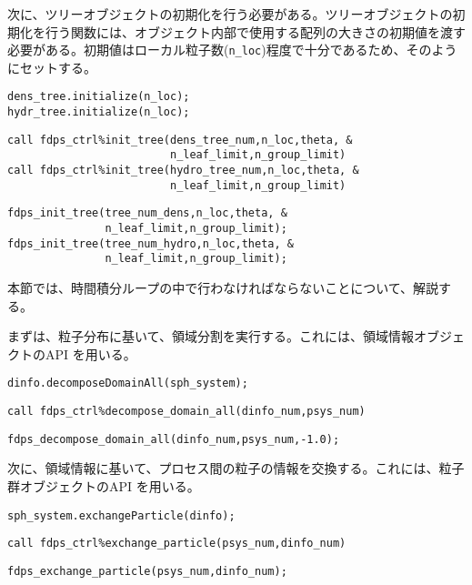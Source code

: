 次に、ツリーオブジェクトの初期化を行う必要がある。ツリーオブジェクトの初期化を行う関数には、オブジェクト内部で使用する配列の大きさの初期値を渡す必要がある。初期値はローカル粒子数(\texttt{n\_loc})程度で十分であるため、そのようにセットする。
\ifCpp %
\begin{lstlisting}[caption=相互作用ツリークラスの初期化]
dens_tree.initialize(n_loc);
hydr_tree.initialize(n_loc);
\end{lstlisting}
\endifCpp
\ifFtn %
\begin{lstlisting}[caption=相互作用ツリークラスの初期化]
call fdps_ctrl%init_tree(dens_tree_num,n_loc,theta, &
                         n_leaf_limit,n_group_limit)
call fdps_ctrl%init_tree(hydro_tree_num,n_loc,theta, &
                         n_leaf_limit,n_group_limit)
\end{lstlisting}
\endifFtn
\ifC %
\begin{lstlisting}[caption=相互作用ツリークラスの初期化]
fdps_init_tree(tree_num_dens,n_loc,theta, &
               n_leaf_limit,n_group_limit);
fdps_init_tree(tree_num_hydro,n_loc,theta, &
               n_leaf_limit,n_group_limit);
\end{lstlisting}
\endifC

本節では、時間積分ループの中で行わなければならないことについて、解説する。

まずは、粒子分布に基いて、領域分割を実行する。これには、領域情報オブジェクトのAPI \decomposeDomainAll を用いる。
\ifCpp %
\begin{lstlisting}[caption=領域分割の実行]
dinfo.decomposeDomainAll(sph_system);
\end{lstlisting}
\endifCpp
\ifFtn %
\begin{lstlisting}[caption=領域分割の実行]
call fdps_ctrl%decompose_domain_all(dinfo_num,psys_num)
\end{lstlisting}
\endifFtn
\ifC %
\begin{lstlisting}[caption=領域分割の実行]
fdps_decompose_domain_all(dinfo_num,psys_num,-1.0);
\end{lstlisting}
\endifC

次に、領域情報に基いて、プロセス間の粒子の情報を交換する。これには、粒子群オブジェクトのAPI \exchangeParticle を用いる。
\ifCpp %
\begin{lstlisting}[caption=粒子交換の実行]
sph_system.exchangeParticle(dinfo);
\end{lstlisting}
\endifCpp
\ifFtn %
\begin{lstlisting}[caption=粒子交換の実行]
call fdps_ctrl%exchange_particle(psys_num,dinfo_num)
\end{lstlisting}
\endifFtn
\ifC %
\begin{lstlisting}[caption=粒子交換の実行]
fdps_exchange_particle(psys_num,dinfo_num);
\end{lstlisting}
\endifC

